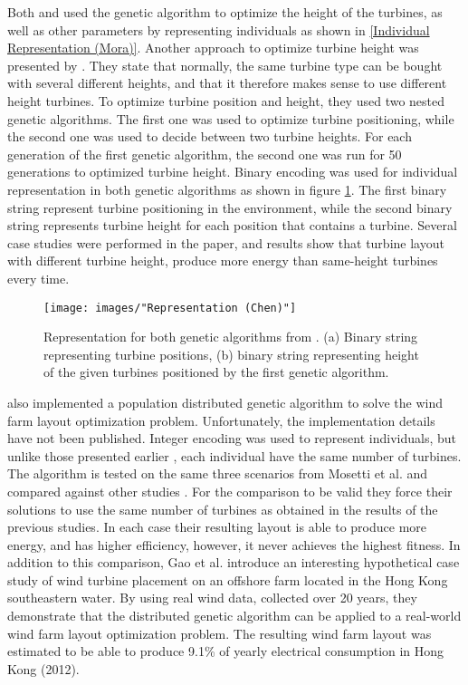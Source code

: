 \noindent Both \cite{Mora} and \cite{Gonzalez} used the genetic algorithm to optimize the height of the turbines, as well as other parameters by representing individuals as shown in \ref{Individual Representation (Mora)}. Another approach to optimize turbine height was presented by \cite{Chen}. They state that normally, the same turbine type can be bought with several different heights, and that it therefore makes sense to use different height turbines. To optimize turbine position and height, they used two nested genetic algorithms. The first one was used to optimize turbine positioning, while the second one was used to decide between two turbine heights. For each generation of the first genetic algorithm, the second one was run for 50 generations to optimized turbine height. Binary encoding was used for individual representation in both genetic algorithms as shown in figure \ref{Representation (Chen)}. The first binary string represent turbine positioning in the environment, while the second binary string represents turbine height for each position that contains a turbine. Several case studies were performed in the paper, and results show that turbine layout with different turbine height, produce more energy than same-height turbines every time. \\


\begin{figure}[h!]
\begin{center}
\texttt{[image: images/"Representation (Chen)"]}
\caption{Representation for both genetic algorithms from \citep{Chen}. (a) Binary string representing turbine positions, (b) binary string representing height of the given turbines positioned by the first genetic algorithm.}
\label{Representation (Chen)}
\end{center}
\end{figure}


\noindent \cite{Gao} also implemented a population distributed genetic algorithm to solve the wind farm layout optimization problem. Unfortunately, the implementation details have not been published. Integer encoding was used to represent individuals, but unlike those presented earlier \citep{Mora, Kusiak, Gonzalez, Saavedra-Morena}, each individual have the same number of turbines. The algorithm is tested on the same three scenarios from Mosetti et al. and compared against other studies \citep{Mosetti, Grady, Gonzalez, Wan}. For the comparison to be valid they force their solutions to use the same number of turbines as obtained in the results of the previous studies. In each case their resulting layout is able to produce more energy, and has higher efficiency, however, it never achieves the highest fitness. In addition to this comparison, Gao et al. introduce an interesting hypothetical case study of wind turbine placement on an offshore farm located in the Hong Kong southeastern water. By using real wind data, collected over 20 years, they demonstrate that the distributed genetic algorithm can be applied to a real-world wind farm layout optimization problem. The resulting wind farm layout was estimated to be able to produce 9.1\% of yearly electrical consumption in Hong Kong (2012).


